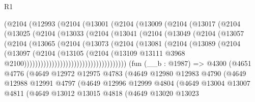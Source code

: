 \begin{lexlean}{R1}
\begin{coremodule}
              (@2104
                (@12993
                  (@2104
                    (@13001
                      (@2104
                        (@13009
                          (@2104
                            (@13017
                              (@2104
                                (@13025
                                  (@2104
                                    (@13033
                                      (@2104
                                        (@13041
                                          (@2104
                                            (@13049
                                              (@2104
                                                (@13057
                                                  (@2104
                                                    (@13065
                                                      (@2104
                                                        (@13073
                                                          (@2104
                                                            (@13081
                                                              (@2104
                                                                (@13089
                                                                  (@2104
                                                                    (@13097
                                                                      (@2104
                                                                        (@13105
                                                                          (@2104
                                                                            (@13109
                                                                              @13111
                                                                              @3968
                                                                              @2100)))))))))))))))))))))))))))))))))))))
    (fun (__b : @1987) =>
    @4300
      (@4651
        @4776
        (@4649
          @12972
          @12975
          @4783
          (@4649
            @12980
            @12983
            @4790
            (@4649
              @12988
              @12991
              @4797
              (@4649
                @12996
                @12999
                @4804
                (@4649
                  @13004
                  @13007
                  @4811
                  (@4649
                    @13012
                    @13015
                    @4818
                    (@4649
                      @13020
                      @13023

\end{coremodule}
\end{lexlean}
